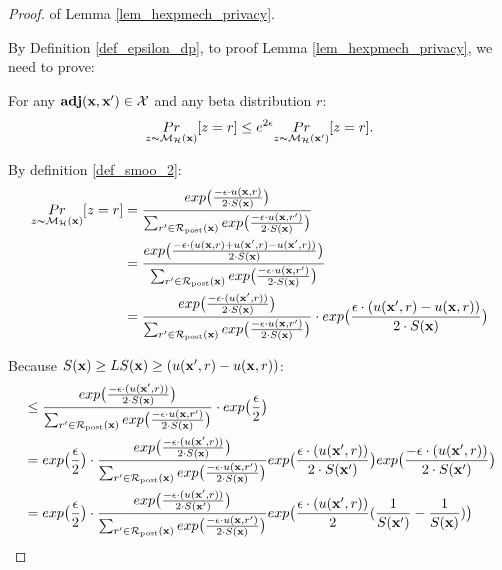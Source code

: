 \documentclass{article}
\begin{document}
\begin{proof} of Lemma \ref{lem_hexpmech_privacy}.

  By Definition \ref{def_epsilon_dp}, to proof Lemma \ref{lem_hexpmech_privacy}, we need to prove:

  For any $\adj{\dataobs}{\dataobs'} \in \mathcal{X}$ and any beta distribution $r$:
  \begin{equation*}
  \hexpmechPr{\dataobs}{z = r} \leq e^{2\epsilon} \hexpmechPr{\dataobs'}{z = r}. 
  \end{equation*}

  By definition \ref{def_smoo_2}:
  \begin{equation*}
  \begin{split}
  \hexpmechPr{\dataobs}{z = r} 
  & = \frac {exp\big(\frac{-\epsilon\cdot\ux{r}}{2\cdot S(\dataobs)}\big)}{\unomalizer{\dataobs}} \\
  & = \frac {exp\big(
  \frac{-\epsilon\cdot(\ux{r} + \uxadj{r} - \uxadj{r})}{2\cdot S(\dataobs)}
  \big)}
  {\unomalizer{\dataobs}} \\
  & = \frac {exp\big(
  \frac{-\epsilon\cdot(\uxadj{r})}{2\cdot S(\dataobs)}
  \big)}
  {\unomalizer{\dataobs}}
  \cdot exp\big( \frac{\epsilon\cdot(\uxadj{r} - \ux{r})}{2\cdot S(\dataobs)} \big)\\
  \end{split}
  \end{equation*}

  Because $S(\dataobs) \geq LS(\dataobs) \geq (\uxadj{r} - \ux{r})$:
  \begin{equation*}
  \begin{split}
  & \leq \frac {exp\big(
  \frac{-\epsilon\cdot(\uxadj{r})}{2\cdot S(\dataobs)}
  \big)}
  {\unomalizer{\dataobs}}
  \cdot exp\big( \frac{\epsilon}{2} \big) \\
  & = exp\big( \frac{\epsilon}{2} \big) \cdot 
  \frac {
  exp
  \big(
  \frac{-\epsilon\cdot(\uxadj{r})}{2\cdot S(\dataobs)}
  \big)
  } 
  {\unomalizer{\dataobs}}
  exp
  \big(
  \frac{\epsilon\cdot(\uxadj{r})}{2\cdot S(\dataobs')}
  \big)
  exp
  \big(
  \frac{-\epsilon\cdot(\uxadj{r})}{2\cdot S(\dataobs')}
  \big)\\
  & = exp\big( \frac{\epsilon}{2} \big) \cdot 
  \frac {
  exp
  \big(
  \frac{-\epsilon\cdot(\uxadj{r})}{2\cdot S(\dataobs')}
  \big)
  } 
  {\unomalizer{\dataobs}}
  exp
  \big(
  \frac{\epsilon\cdot(\uxadj{r})}{2}(\frac{1}{S(\dataobs')} - \frac{1}{S(\dataobs)})
  \big)\\
  \end{split}
  \end{equation*}
  

\end{proof}
\end{document}

